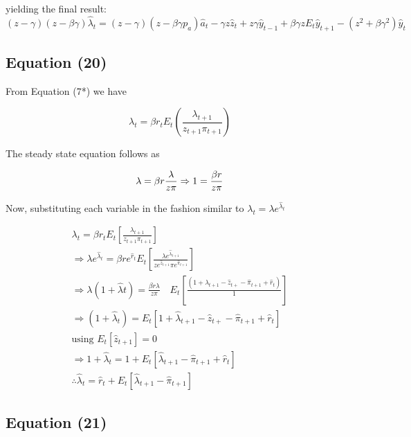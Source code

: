 \documentclass[11pt,preprint, authoryear]{elsarticle}
\numberwithin{equation}{section}
\numberwithin{figure}{section}
\numberwithin{table}{section}
\begin{document}
yielding the final result:
\[(z-\gamma)(z-\beta \gamma) \hat{\lambda}_{t}=(z-\gamma)\left(z-\beta \gamma p_{a}\right) \hat{a}_{t}-\gamma z \hat{z}_{t}+z \gamma \hat{y}_{t-1}+\beta \gamma z E_{t} \hat{y}_{t+1}-\left(z^{2}+\beta \gamma^{2}\right) \hat{y}_{t}\]

\hypertarget{equation-20}{%
\subsection{Equation (20)}\label{equation-20}}

From Equation (7*) we have

\[\lambda_{t}=\beta r_{t} E_{t}\left(\frac{\lambda_{t+1}}{z_{t+1} \pi_{t+1}}\right) \tag{7*}\]

The steady state equation follows as

\[\lambda = \beta r \frac{\lambda} {z \pi} \\
\Rightarrow 1=\frac{\beta r} {z \pi}\]

Now, substituting each variable in the fashion similar to
\(\lambda_t = \lambda e^{\hat{\lambda}_t}\)

\[\begin{array}{l}
\lambda_{t}=\beta r_{t} E_{t}\left[\frac{\lambda_{t+1}}{z_{t+1} \pi_{t+1}}\right]\\
\Rightarrow \lambda e^{\hat{\lambda}_t}=\beta r e^{\hat{r}_{t}} E_{t}\left[\frac{\lambda e^{\hat{\lambda}_{t+1}}}{z e^{\hat{z}_{t+1}} \pi e^{\hat{\pi}_{t+1}}} \right]\\
\Rightarrow \lambda\left(1+\hat{\lambda}{t}\right)=\frac{\beta r \lambda}{z \pi} \quad E_{t}\left[\frac{\left(1+\hat{\lambda}_{t+1}-\hat{z}_{t+}-\hat{\pi}_{t+1}+\hat{r}_{t}\right)}{1}\right]\\
\Rightarrow \left(1+\hat{\lambda}_{t}\right)= E_{t}\left[1+\hat{\lambda}_{t+1}-\hat{z}_{t+}-\hat{\pi}_{t+1}+\hat{r}_{t}\right]\\
\text{using }{ E_t }[\hat{z}_{t+1}]=0\\
\Rightarrow 1+\hat{\lambda}_{t} = 1+E_{t}\left[\hat{\lambda}_{t+1}-\hat{\pi}_{t+1}+\hat{r}_{t}\right]\\
\therefore \hat{\lambda}_{t}=\hat{r}_{t}+E_{t}\left[\hat{\lambda}_{t+1} - \hat{\pi}_{t+1}\right]
\end{array}\]

\hypertarget{equation-21}{%
\subsection{Equation (21)}\label{equation-21}}
\end{document}
